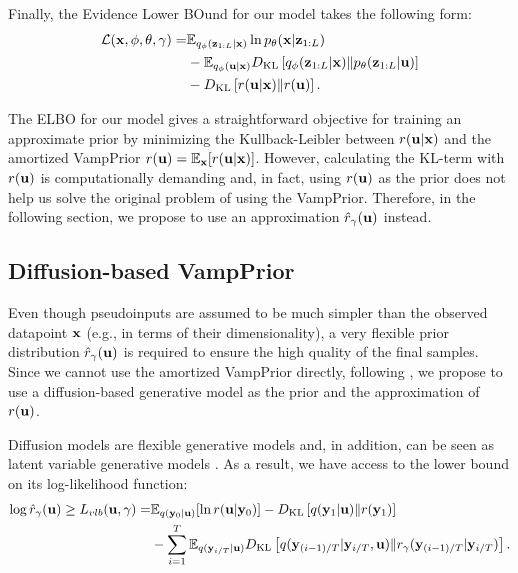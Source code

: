 Finally, the Evidence Lower BOund for our model takes the following form:
\begin{align}\label{eq:our_elbo}
    \mathcal{L}(\rvx, \phi, \theta, \gamma) = 
     &\E_{\Enc{\rvz_{1:L}}{\rvx}} \ln \Dec{\rvx}{\rvz_{1:L}} \\
     &- \E_{q_{\phi}(\rvu|\rvx)}\KL{q_{\phi}(\rvz_{1:L}|\rvx)}{p_{\theta}(\rvz_{1:L}|\rvu)} \\
     &- \KL{r(\rvu|\rvx)}{r(\rvu)}  . 
\end{align}

The ELBO for our model gives a straightforward objective for training an approximate prior by minimizing the Kullback-Leibler between $r({\mathbf{u}}|{\mathbf{x}})$ and the amortized VampPrior $r({\mathbf{u}}) = \mathbb{E}_{{\mathbf{x}}}[r({\mathbf{u}}|{\mathbf{x}})]$. However, calculating the KL-term with $r({\mathbf{u}})$ is computationally demanding and, in fact, using $r({\mathbf{u}})$ as the prior does not help us solve the original problem of using the VampPrior. Therefore, in the following section, we propose to use an approximation $\hat{r}_{\gamma}({\mathbf{u}})$ instead.




 
\subsection{Diffusion-based VampPrior}\label{subsection:diff_prior}
Even though pseudoinputs are assumed to be much simpler than the observed datapoint ${\mathbf{x}}$ (e.g., in terms of their dimensionality), a very flexible prior distribution $\hat{r}_{\gamma}({\mathbf{u}})$ is required to ensure the high quality of the final samples. Since we cannot use the amortized VampPrior directly, following \citep{vahdat2021score, wehenkel2021diffusion}, we propose to use a diffusion-based generative model \citep{ho2020denoising} as the prior and the approximation of $r({\mathbf{u}})$.

Diffusion models are flexible generative models and, in addition, can be seen as latent variable generative models \citep{kingma2021variational}. As a result, we have access to the lower bound on its log-likelihood function: 
\begin{align} \label{eq:5_dvp_diff_elbo}
    \log \hat{r}_{\gamma}(\rvu) \geq L_{vlb}(\rvu, \gamma) = & \E_{q(\rvy_0|\rvu)}[\ln r(\rvu|\rvy_0)]
    - \KL{q(\rvy_1 |\rvu)}{r(\rvy_1)}  \\
    & - \sum_{i=1}^T \E_{q(\rvy_{i/T}|\rvu)} \KL{q(\rvy_{(i-1)/T}|\rvy_{i/T}, \rvu)}{r_{\gamma}(\rvy_{(i-1)/T}|\rvy_{i/T})}. \notag
\end{align}

